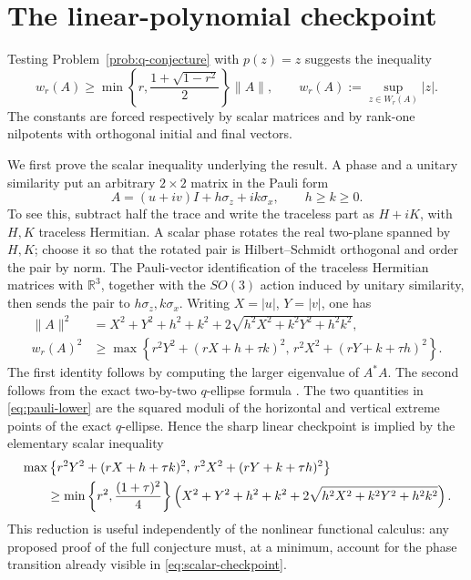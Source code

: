 \documentclass[11pt]{article}
\theoremstyle{remark}
\begin{document}
\section{The linear-polynomial checkpoint}
\label{sec:linear-checkpoint}

Testing Problem~\ref{prob:q-conjecture} with \(p(z)=z\) suggests the
inequality
\begin{equation}
\label{eq:linear-checkpoint}
 w_r(A)\geq
 \min\left\{r,\frac{1+\sqrt{1-r^2}}2\right\}\|A\|,
 \qquad
 w_r(A):=\sup_{z\in W_r(A)}|z|.
\end{equation}
The constants are forced respectively by scalar matrices and by
rank-one nilpotents with orthogonal initial and final vectors.

We first prove the scalar inequality underlying the result.  A
phase and a unitary similarity put an arbitrary \(2\times2\) matrix
in the Pauli form
\[
 A=(u+iv)I+h\sigma_z+ik\sigma_x,
 \qquad h\geq k\geq0.
\]
To see this, subtract half the trace and write the traceless part as
\(H+iK\), with \(H,K\) traceless Hermitian.  A scalar phase rotates
the real two-plane spanned by \(H,K\); choose it so that the rotated
pair is Hilbert--Schmidt orthogonal and order the pair by norm.
The Pauli-vector identification of the traceless Hermitian matrices
with \(\mathbb R^3\), together with the \(SO(3)\) action induced by
unitary similarity, then sends the pair to
\(h\sigma_z,k\sigma_x\).
Writing \(X=|u|\), \(Y=|v|\), one has
\begin{align}
\label{eq:pauli-norm}
 \|A\|^2
 &=
 X^2+Y^2+h^2+k^2
 +2\sqrt{h^2X^2+k^2Y^2+h^2k^2},\\
\label{eq:pauli-lower}
 w_r(A)^2
 &\geq
 \max\left\{
 r^2Y^2+(rX+h+\tau k)^2,\,
 r^2X^2+(rY+k+\tau h)^2
 \right\}.
\end{align}
The first identity follows by computing the larger eigenvalue of
\(A^*A\).  The second follows from the exact two-by-two
\(q\)-ellipse formula \cite[Lemma~6]{ChienNakazatoPsarrakos2005}.
The two quantities in \eqref{eq:pauli-lower} are the squared moduli
of the horizontal and vertical extreme points of the exact
\(q\)-ellipse.  Hence the sharp linear checkpoint is implied by the
elementary scalar inequality
\begin{align}
\label{eq:scalar-checkpoint}
 &\max\left\{
 r^2Y^2+(rX+h+\tau k)^2,\,
 r^2X^2+(rY+k+\tau h)^2
 \right\}\\
 &\qquad\geq
 \min\left\{r^2,\frac{(1+\tau)^2}{4}\right\}
 \left(
 X^2+Y^2+h^2+k^2+
 2\sqrt{h^2X^2+k^2Y^2+h^2k^2}
 \right).\notag
\end{align}
This reduction is useful independently of the nonlinear functional
calculus: any proposed proof of the full conjecture must, at a
minimum, account for the phase transition already visible in
\eqref{eq:scalar-checkpoint}.
\end{document}
